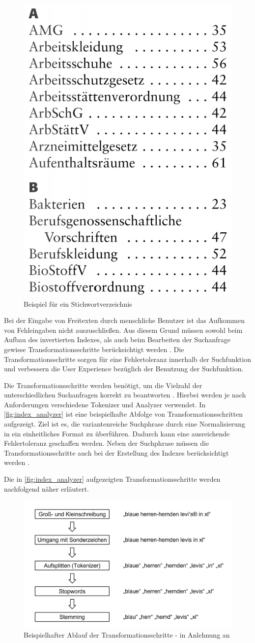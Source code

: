 \begin{figure}[H]
    \centering
    \includegraphics[width=0.3\linewidth]{images/Stichwortverzeichnis.png}
    \caption{Beispiel für ein Stichwortverzeichnis \cite{weka.de.2014}}
    \label{fig:inverted_index}
\end{figure}

Bei der Eingabe von Freitexten durch menschliche Benutzer ist das Aufkommen von Fehleingaben nicht auszuschließen. Aus diesem Grund müssen sowohl beim Aufbau des invertierten Indexes, als auch beim Bearbeiten der Suchanfrage gewisse Transformationsschritte berücksichtigt werden \cite{SebastianRuss.2017}. Die Transformationsschritte sorgen für eine Fehlertoleranz innerhalb der Suchfunktion und verbessern die User Experience bezüglich der Benutzung der Suchfunktion.

Die Transformationsschritte werden benötigt, um die Vielzahl der unterschiedlichen Suchanfragen korrekt zu beantworten \cite{SebastianRuss.2017}. Hierbei werden je nach Anforderungen verschiedene Tokenizer und Analyzer verwendet. In \autoref{fig:index_analyzer} ist eine beispielhafte Abfolge von Transformationsschritten aufgezeigt. Ziel ist es, die variantenreiche Suchphrase durch eine Normalisierung in ein einheitliches Format zu überführen. Dadurch kann eine ausreichende Fehlertoleranz geschaffen werden. Neben der Suchphrase müssen die Transformationsschritte auch bei der Erstellung des Indexes berücksichtigt werden \cite{SebastianRuss.2017}.

Die in \autoref{fig:index_analyzer} aufgezeigten Transformationsschritte werden nachfolgend näher erläutert.

\begin{figure}[H]
    \centering
    \includegraphics[width=0.65\linewidth]{images/Index_Analyzer.png}
    \caption{Beispielhafter Ablauf der Transformationsschritte - in Anlehnung an \cite{SebastianRuss.2017}}
    \label{fig:index_analyzer}
\end{figure}

